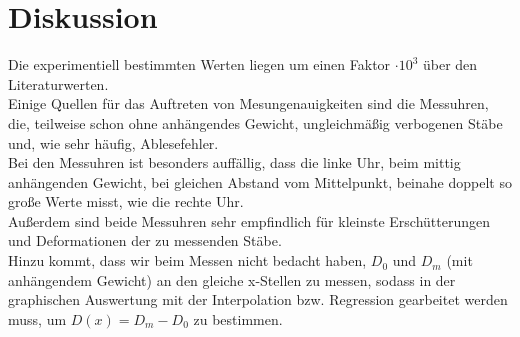 \section{Diskussion}
\label{sec:Diskussion}


Die experimentiell bestimmten Werten liegen um einen Faktor $\cdot 10^3$ über den Literaturwerten.\\


Einige Quellen für das Auftreten von Mesungenauigkeiten sind die Messuhren, die, teilweise 
schon ohne anhängendes Gewicht, ungleichmäßig verbogenen Stäbe und, wie sehr häufig, Ablesefehler.\\
Bei den Messuhren ist besonders auffällig, dass die linke Uhr, beim mittig anhängenden Gewicht, 
bei gleichen Abstand vom Mittelpunkt, beinahe doppelt so große Werte misst, wie die rechte Uhr.\\
Außerdem sind beide Messuhren sehr empfindlich für kleinste Erschütterungen und Deformationen der zu 
messenden Stäbe.\\
Hinzu kommt, dass wir beim Messen nicht bedacht haben, $D_0$ und $D_m$ (mit anhängendem Gewicht)
an den gleiche x-Stellen zu messen, sodass in der graphischen Auswertung mit der Interpolation 
bzw. Regression gearbeitet werden muss, um $D(x) = D_m - D_0$ zu bestimmen.